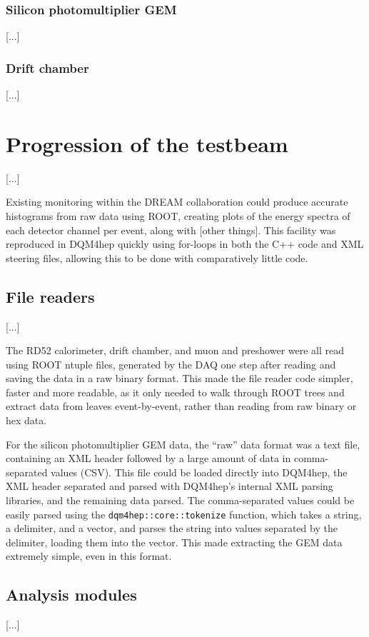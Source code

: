 \subsubsection{Silicon photomultiplier GEM}
[...]

\subsubsection{Drift chamber}
[...]

\section{Progression of the testbeam} %
[...]

Existing monitoring within the DREAM collaboration could produce accurate histograms from raw data using ROOT, creating plots of the energy spectra of each detector channel per event, along with [other things]. This facility was reproduced in DQM4hep quickly using for-loops in both the C++ code and XML steering files, allowing this to be done with comparatively little code.

\subsection{File readers}
[...]

The RD52 calorimeter, drift chamber, and muon and preshower were all read using ROOT ntuple files, generated by the DAQ one step after reading and saving the data in a raw binary format. This made the file reader code simpler, faster and more readable, as it only needed to walk through ROOT trees and extract data from leaves event-by-event, rather than reading from raw binary or hex data.

For the silicon photomultiplier GEM data, the ``raw'' data format was a text file, containing an XML header followed by a large amount of data in comma-separated values (CSV). This file could be loaded directly into DQM4hep, the XML header separated and parsed with DQM4hep's internal XML parsing libraries, and the remaining data parsed. The comma-separated values could be easily parsed using the \texttt{dqm4hep::core::tokenize} function, which takes a string, a delimiter, and a vector, and parses the string into values separated by the delimiter, loading them into the vector. This made extracting the GEM data extremely simple, even in this format.

\subsection{Analysis modules}
[...]

